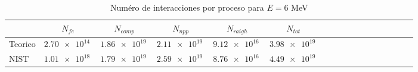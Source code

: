 \begin{table}
\caption{Numéro de interacciones por proceso para $E=6$ MeV}
\begin{tabular}{lcccccccccccccccc}
\toprule
 & $N_{fe}$ & $N_{comp}$  & $N_{npp}$  & $N_{raigh}$ & $N_{tot}$ \\
\midrule
Teorico & $\SI{2.70e+14}{}$ & $\SI{1.86e+19}{}$ & $\SI{2.11e+19}{}$ & $\SI{9.12e+16}{}$ & $\SI{3.98e+19}{}$ \\
NIST & $\SI{1.01e+18}{}$ & $\SI{1.79e+19}{}$ & $\SI{2.59e+19}{}$ & $\SI{8.76e+16}{}$ & $\SI{4.49e+19}{}$ \\
\bottomrule
\end{tabular}
\end{table}
